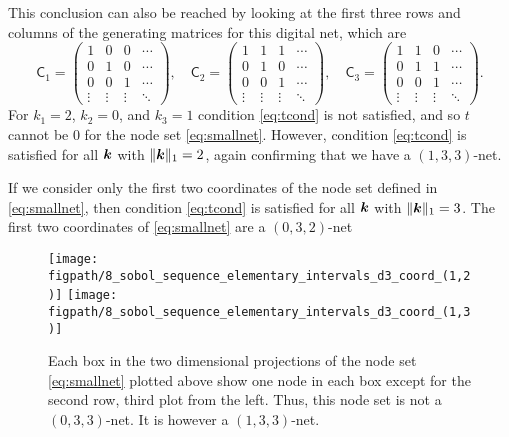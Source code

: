 \documentclass{svproc}
\newcommand{\figpath}{Figures}
\begin{document}
This conclusion can also be reached by looking at the first three rows and columns of the generating matrices for this digital net, which are
\begin{equation*}
	\mathsf{C}_1 = \begin{pmatrix}
		1 & 0 & 0 & \cdots \\ 0 & 1 & 0 & \cdots \\ 0 & 0 & 1 & \cdots \\ \vdots & \vdots & \vdots & \ddots
	\end{pmatrix}, \quad
	\mathsf{C}_2 = \begin{pmatrix}
		1 & 1 & 1 & \cdots \\ 0 & 1 & 0 & \cdots \\ 0 & 0 & 1 & \cdots \\ \vdots & \vdots & \vdots & \ddots
	\end{pmatrix}, \quad
	\mathsf{C}_3 = \begin{pmatrix}
	1 & 1 & 0 & \cdots \\ 0 & 1 & 1 & \cdots \\ 0 & 0 & 1 & \cdots \\ \vdots & \vdots & \vdots & \ddots
\end{pmatrix}.
\end{equation*}
For $k_1=2$, $k_2 = 0$, and $k_3 = 1$ condition \eqref{eq:tcond} is not satisfied, and so $t$ cannot be $0$ for the node set  \eqref{eq:smallnet}.  However, condition \eqref{eq:tcond} is satisfied for all ${\boldsymbol{k}}$ with $\lVert {\boldsymbol{k}} \rVert_1 = 2$, again confirming that we have a $(1,3,3)$-net.

If we consider only the first two coordinates of the node set defined in \eqref{eq:smallnet}, then  condition \eqref{eq:tcond} is satisfied for all ${\boldsymbol{k}}$ with $\lVert {\boldsymbol{k}} \rVert_1 = 3$.  The first two coordinates of \eqref{eq:smallnet} are a $(0,3,2)$-net



\begin{figure}
	\centering
	\texttt{[image: \\figpath/8\_sobol\_sequence\_elementary\_intervals\_d3\_coord\_(1,2)]}
	\texttt{[image: \\figpath/8\_sobol\_sequence\_elementary\_intervals\_d3\_coord\_(1,3)]}
	\caption{Each box in the two dimensional projections of the node set \eqref{eq:smallnet} plotted above show one node in each box except for the second row, third plot from the left.  Thus, this node set is not a $(0,3,3)$-net.  It is however a $(1,3,3)$-net.  \label{fig:elementinterval}}
\end{figure}
\end{document}
